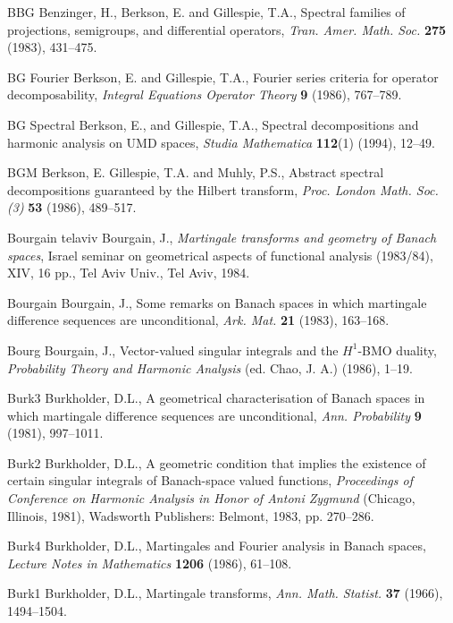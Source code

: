 \documentclass[mstat,12pt]{unswthesis}  %
\numberwithin{equation}{section}
\begin{document}
\begin{thebibliography}{999}

\bibitem
{BBG} Benzinger, H., Berkson, E. and Gillespie, T.A.,
Spectral families of projections, semigroups, and differential operators,
\textit{Tran. Amer. Math. Soc.} \textbf{275} (1983), 431--475.

\bibitem
{BG Fourier} Berkson, E. and Gillespie, T.A.,
Fourier series criteria for operator decomposability,
\textit{Integral Equations Operator Theory} \textbf{9} (1986), 767--789.

\bibitem
{BG Spectral} Berkson, E., and Gillespie, T.A.,
Spectral decompositions and harmonic analysis on UMD spaces,
\textit{Studia Mathematica} \textbf{112}(1) (1994), 12--49.

\bibitem
{BGM} Berkson, E. Gillespie, T.A. and Muhly, P.S.,
Abstract spectral decompositions guaranteed by the Hilbert transform,
\textit{Proc. London Math. Soc. (3)} \textbf{53} (1986), 489--517.

\bibitem
{Bourgain telaviv} 
Bourgain, J., {\em Martingale transforms and geometry of Banach spaces},
Israel seminar on geometrical aspects of functional analysis
(1983/84), XIV, 16 pp., Tel Aviv Univ., Tel Aviv, 1984.

\bibitem
{Bourgain} Bourgain, J.,
Some remarks on Banach spaces in which martingale difference sequences are
unconditional,
\textit{Ark. Mat.} \textbf{21} (1983), 163--168.

\bibitem
{Bourg} Bourgain, J.,
Vector-valued singular integrals and the $H^1$-BMO duality,
\textit{Probability Theory and Harmonic Analysis} (ed. Chao, J. A.) (1986), 
1--19.

\bibitem
{Burk3} Burkholder, D.L.,
A geometrical characterisation of Banach spaces in which martingale difference
sequences are unconditional,
\textit{Ann. Probability} \textbf{9} (1981), 997--1011.

\bibitem
{Burk2} Burkholder, D.L.,
A geometric condition that implies the existence of certain singular integrals
of Banach-space valued functions,
\textit{Proceedings of Conference on Harmonic Analysis in Honor of Antoni
Zygmund} (Chicago, Illinois, 1981), Wadsworth Publishers: Belmont,
1983, pp. 270--286.

\bibitem
{Burk4} Burkholder, D.L.,
Martingales and Fourier analysis in Banach spaces,
\textit{Lecture Notes in Mathematics} \textbf{1206} (1986), 61--108.

\bibitem
{Burk1} Burkholder, D.L.,
Martingale transforms,
\textit{Ann. Math. Statist.} \textbf{37} (1966), 1494--1504.


\end{thebibliography}
\end{document}
